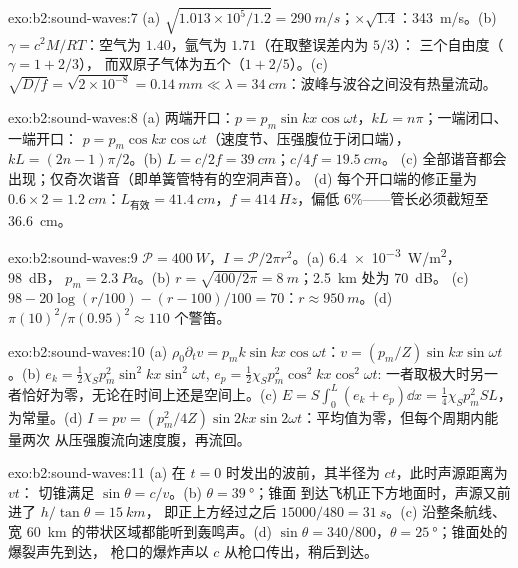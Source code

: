 \begin{solution}{exo:b2:sound-waves:7}
(a) $\sqrt{1.013 \times 10^5/1.2} = \qty{290}{m/s}$；$\times\sqrt{1.4}$：\qty{343}{m/s}。(b)
$\gamma = c^2M/RT$：空气为 $1.40$，氩气为 $1.71$（在取整误差内为 $5/3$）：
三个自由度（$\gamma = 1 + 2/3$），
而双原子气体为五个（$1 + 2/5$）。(c) $\sqrt{D/f} = \sqrt{2 \times 10^{-8}} = \qty{0.14}{mm}
\ll \lambda = \qty{34}{cm}$：波峰与波谷之间没有热量流动。
\end{solution}

\begin{solution}{exo:b2:sound-waves:8}
(a) 两端开口：$p = p_m\sin kx\cos\omega t$，$kL = n\pi$；一端闭口、一端开口：
$p = p_m\cos kx\cos\omega t$（速度节、压强腹位于闭口端），
$kL = (2n - 1)\pi/2$。(b) $L = c/2f = \qty{39}{cm}$；$c/4f = \qty{19.5}{cm}$。
(c) 全部谐音都会出现；仅奇次谐音（即单簧管特有的空洞声音）。
(d) 每个开口端的修正量为 $0.6 \times 2 = \qty{1.2}{cm}$：$L_{\text{有效}} = \qty{41.4}{cm}$，$f =
\qty{414}{Hz}$，偏低 $6\%$——管长必须截短至 \qty{36.6}{cm}。
\end{solution}

\begin{solution}{exo:b2:sound-waves:9}
$\mathcal P = \qty{400}{W}$，$I = \mathcal P/2\pi r^2$。(a) \qty{6.4e-3}{W/m^2}，\qty{98}{dB}，
$p_m = \qty{2.3}{Pa}$。(b) $r = \sqrt{400/2\pi} = \qty{8}{m}$；\qty{2.5}{km} 处为 \qty{70}{dB}。
(c) $98 - 20\log(r/100) - (r - 100)/100 = 70$：$r \approx \qty{950}{m}$。(d)
$\pi(10)^2/\pi(0.95)^2 \approx 110$ 个警笛。
\end{solution}

\begin{solution}{exo:b2:sound-waves:10}
(a) $\rho_0\partial_tv = p_mk\sin kx\cos\omega t$：$v = (p_m/Z)\sin kx\sin\omega t$。(b)
$e_k = \tfrac12\chi_Sp_m^2\sin^2kx\sin^2\omega t$, $e_p = \tfrac12\chi_Sp_m^2\cos^2kx\cos^2\omega t$:
一者取极大时另一者恰好为零，无论在时间上还是空间上。(c) $E =
S\int_0^L(e_k + e_p)\dd x = \tfrac14\chi_Sp_m^2SL$，为常量。(d) $I = pv =
(p_m^2/4Z)\sin2kx\sin2\omega t$：平均值为零，但每个周期内能量两次
从压强腹流向速度腹，再流回。
\end{solution}

\begin{solution}{exo:b2:sound-waves:11}
(a) 在 $t = 0$ 时发出的波前，其半径为 $ct$，此时声源距离为 $vt$：
切锥满足 $\sin\theta = c/v$。(b) $\theta = \qty{39}{\degree}$；锥面
到达飞机正下方地面时，声源又前进了 $h/\tan\theta = \qty{15}{km}$，
即正上方经过之后 $15000/480 = \qty{31}{s}$。(c) 沿整条航线、
宽 \qty{60}{km} 的带状区域都能听到轰鸣声。(d) $\sin\theta
= 340/800$，$\theta = \qty{25}{\degree}$；锥面处的爆裂声先到达，
枪口的爆炸声以 $c$ 从枪口传出，稍后到达。
\end{solution}

